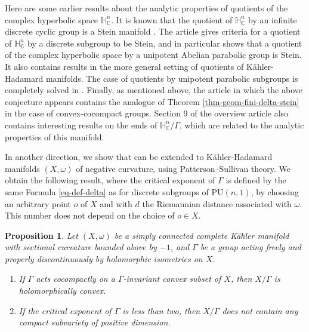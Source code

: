 \documentclass{article}
\newtheorem{propositionIntro}[theoremIntro]{Proposition}
\theoremstyle{definition}
\theoremstyle{remark}
\newcommand{\C}{\mathbb{C}}
\newcommand{\HNC}{\mathbb{H}^{n}_{\C}}
\newcommand{\PU}{\mathrm{PU}}
\begin{document}
	
	Here are some earlier results about the analytic properties of quotients of the complex hyperbolic space $\HNC$. It is known that the quotient of $\HNC$ by an infinite discrete cyclic group is a Stein manifold \cite{defabritiisFamilyComplexManifolds1998manuel,defabritiisQuotientsUnitBall2001manuel,miebachQuotientsBoundedHomogeneous2010}. The article \cite{chenDiscreteGroupsHolomorphic2013} gives criteria for a quotient of $\HNC$ by a discrete subgroup to be Stein, and in particular shows that a quotient of the complex hyperbolic space by a unipotent Abelian parabolic group is Stein. It also contains results in the more general setting of quotients of Kähler-Hadamard manifolds. The case of quotients by unipotent parabolic subgroups is completely solved in \cite{miebachQuotientsBoundedHomogeneous2024}. Finally, as mentioned above, the article \cite{deyNoteComplexhyperbolicKleinian2020} in which the above conjecture appears contains the analogue of Theorem \ref{thm-geom-fini-delta-stein} in the case of convex-cocompact groups. Section 9 of the overview article \cite{kapovichSurveyComplexHyperbolic2022} also contains interesting results on the ends of $\HNC/\Gamma$, which are related to the analytic properties of this manifold.
	
	In another direction, we show that \cite[Theorem 1]{deyNoteComplexhyperbolicKleinian2020} can be extended to Kähler-Hadamard manifolds $(X,\omega)$ of negative curvature, using Patterson--Sullivan theory. We obtain the following result, where the critical exponent of $\Gamma$ is defined by the same Formula \eqref{eq-def-delta} as for discrete subgroups of $\PU(n,1)$, by choosing an arbitrary point $o$ of $X$ and with $d$ the Riemannian distance associated with $\omega$. This number does not depend on the choice of $o\in X$.
	
	\begin{propositionIntro}\label{prop-KH-general}
		Let $(X,\omega)$ be a simply connected complete Kähler manifold with sectional curvature bounded above by $-1$, and $\Gamma$ be a group acting freely and properly discontinuously by holomorphic isometries on $X$.\begin{enumerate}
			\item If $\Gamma$ acts cocompactly on a $\Gamma$-invariant convex subset of $X$, then $X/\Gamma$ is holomorphically convex.
			\item If the critical exponent of $\Gamma$ is less than two, then $X/\Gamma$ does not contain any compact subvariety of positive dimension. 
		\end{enumerate}
	\end{propositionIntro}
	
\end{document}

